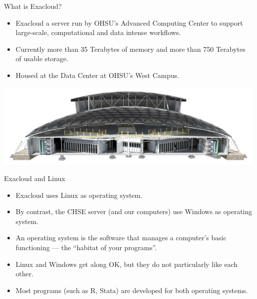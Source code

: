 \documentclass[12pt,t,xcolor=table]{beamer}
\begin{document}
\begin{frame}[label={sec:orgheadline4}]{What is Exacloud?}
\vspace{1em}

\begin{itemize}
\item Exacloud a server run by OHSU's Advanced Computing Center to support large-scale, computational and data intense workflows.\setlength\itemsep{0.5em}

\item Currently more than 35 Terabytes of memory and more than 750 Terabytes of usable storage.

\item Housed at the Data Center at OHSU's West Campus.\vspace{0.5em}
\end{itemize}

\vspace{1em}
\begin{center}
  \includegraphics[width=.8\textwidth]{Figures/ohsu-datacenter.png}
\end{center}
\end{frame}


\begin{frame}[label={sec:orgheadline5}]{Exacloud and Linux}
\vspace{0.5em}

\begin{itemize}
\item Exacloud uses Linux as operating system.\setlength\itemsep{0.5em}

\item By contrast, the CHSE server (and our computers) use Windows as operating system.

\item An operating system is the software that manages a computer's basic functioning --- the ``habitat of your programs''.

\item Linux and Windows get along OK, but they do not particularly like each other.

\item Most programs (such as R, Stata) are developed for both operating systems.
\end{itemize}
\end{frame}
\end{document}
